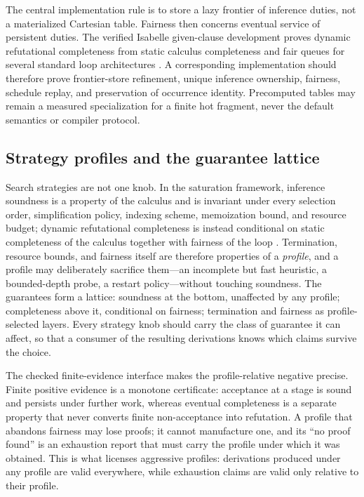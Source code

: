 \documentclass[11pt]{article}
\theoremstyle{definition}
\theoremstyle{remark}
\begin{document}
The central implementation rule is to store a lazy frontier of inference duties,
not a materialized Cartesian table.  Fairness then concerns eventual service of
persistent duties.  The verified Isabelle given-clause development proves dynamic
refutational completeness from static calculus completeness and fair queues for
several standard loop architectures \cite{GivenClauseAFP}.  A corresponding
implementation should therefore prove frontier-store refinement, unique
inference ownership, fairness, schedule replay, and preservation of occurrence
identity.  Precomputed tables may remain a measured specialization for a finite
hot fragment, never the default semantics or compiler protocol.

\subsection{Strategy profiles and the guarantee lattice}

Search strategies are not one knob.  In the saturation framework, inference
soundness is a property of the calculus and is invariant under every
selection order, simplification policy, indexing scheme, memoization bound,
and resource budget; dynamic refutational completeness is instead conditional
on static completeness of the calculus together with fairness of the loop
\cite{WaldmannSaturation,GivenClauseAFP}.  Termination, resource bounds, and
fairness itself are therefore properties of a \emph{profile}, and a profile
may deliberately sacrifice them---an incomplete but fast heuristic, a
bounded-depth probe, a restart policy---without touching soundness.  The
guarantees form a lattice: soundness at the bottom, unaffected by any profile;
completeness above it, conditional on fairness; termination and fairness as
profile-selected layers.  Every strategy knob should carry the class of
guarantee it can affect, so that a consumer of the resulting derivations knows
which claims survive the choice.

The checked finite-evidence interface makes the profile-relative negative
precise.  Finite positive evidence is a monotone certificate: acceptance at a
stage is sound and persists under further work, whereas eventual completeness
is a separate property that never converts finite non-acceptance into
refutation.  A profile that abandons fairness may lose proofs; it cannot
manufacture one, and its ``no proof found'' is an exhaustion report that must
carry the profile under which it was obtained.  This is what licenses
aggressive profiles: derivations produced under any profile are valid
everywhere, while exhaustion claims are valid only relative to their profile.
\end{document}
